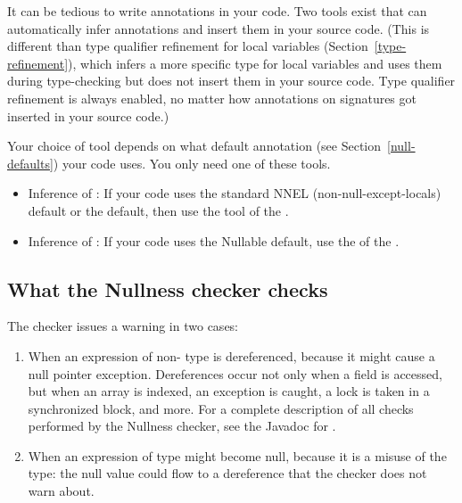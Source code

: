 It can be tedious to write annotations in your code.  Two tools exist that
can automatically infer annotations and insert them in your source code.
(This is different than type qualifier refinement for local variables
(Section~\ref{type-refinement}), which infers a more specific type for
local variables and uses them during type-checking but does not insert them
in your source code.  Type qualifier refinement is always enabled, no
matter how annotations on signatures got inserted in your source code.)

Your choice of tool depends on what default annotation (see
Section~\ref{null-defaults}) your code uses.  You only need one of these tools.

\begin{itemize}

\item
  Inference of :
  If your code uses the standard NNEL (non-null-except-locals) default or
  the  default, then use the
  tool of the .

\item
  Inference of :
  If your code uses the Nullable default, use the
   of the .

\end{itemize}




\subsection{What the Nullness checker checks\label{nullness-checks}}

The checker issues a warning in two cases:

\begin{enumerate}

\item
  When an expression of non- type
  is dereferenced, because it might cause a null pointer exception.
  Dereferences occur not only when a field is accessed, but when an array
  is indexed, an exception is caught, a lock is taken in a synchronized
  block, and more.  For a complete description of all checks performed by
  the Nullness checker, see the Javadoc for
  .

\item
  When an expression of  type might become null, because it
  is a misuse of the type:  the null value could flow to a dereference that
  the checker does not warn about.

\end{enumerate}


